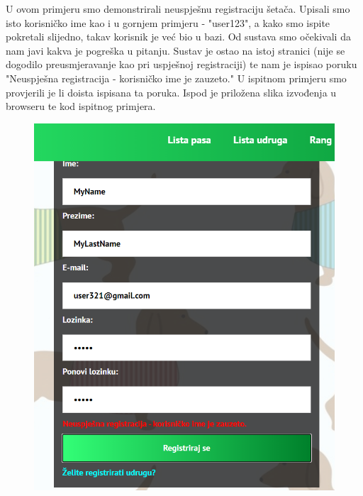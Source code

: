 		 U ovom primjeru smo demonstrirali neuspješnu registraciju šetača. Upisali smo isto korisničko ime kao i u gornjem primjeru - "user123", a kako smo ispite pokretali slijedno, takav korisnik je već bio u bazi. Od sustava smo očekivali da nam javi kakva je pogreška u pitanju. Sustav je ostao na istoj stranici (nije se dogodilo preusmjeravanje kao pri uspješnoj registraciji) te nam je ispisao poruku "Neuspješna registracija - korisničko ime je zauzeto." U ispitnom primjeru smo provjerili je li doista ispisana ta poruka. Ispod je priložena slika izvođenja u browseru te kod ispitnog primjera. 
		 
		 	\begin{figure}[H]
		 		\includegraphics[scale=0.70]{slike/UsernameError.PNG}
		 		\centering
		 	\end{figure}
			 
